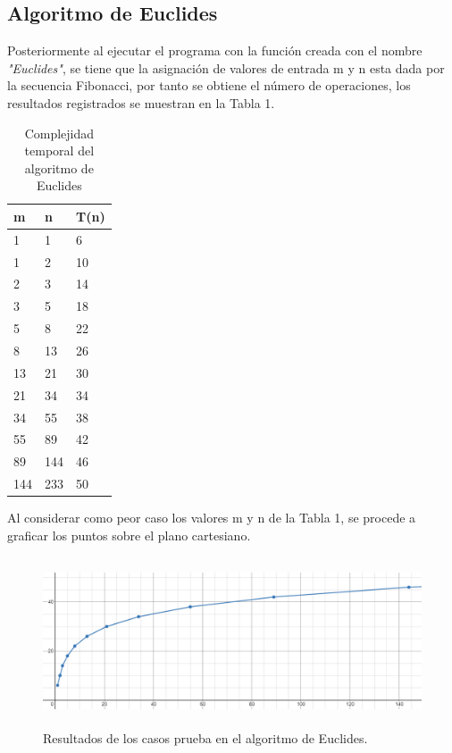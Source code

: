 \documentclass[12pt,twoside]{article}
\begin{document}
    \subsection{Algoritmo de Euclides}
Posteriormente al ejecutar el programa con la funci\'on creada con el nombre \textit{"Euclides"}, se tiene que la asignación de valores de entrada m y n esta dada por la secuencia Fibonacci, por tanto se obtiene el n\'umero de operaciones, los resultados registrados se muestran en la Tabla 1.
    \begin{longtable}{|l|l|l|}
        \caption{Complejidad temporal del algoritmo de Euclides}\\
            \hline
                \textbf{m}&\textbf{n}&\textbf{T(n)}\\
            \hline
                {1}&{1}&{6}\\
            \hline
                {1}&{2}&{10}\\
            \hline
                {2}&{3}&{14}\\
            \hline
                {3}&{5}&{18}\\
            \hline
                {5}&{8}&{22}\\
            \hline
                {8}&{13}&{26}\\
            \hline
                {13}&{21}&{30}\\
            \hline
                {21}&{34}&{34}\\
            \hline
                {34}&{55}&{38}\\
            \hline
                {55}&{89}&{42}\\
            \hline
                {89}&{144}&{46}\\
            \hline
                {144}&{233}&{50}\\
            \hline
    \end{longtable}
Al considerar como peor caso los valores m y n de la Tabla 1, se procede a graficar los puntos sobre el plano cartesiano.
\begin{figure}[H]
    \centering
    \includegraphics[height=5cm]{imagenes/grafica321.png}
    \caption{Resultados de los casos prueba en el algoritmo de Euclides.}
\end{figure}
\end{document}

